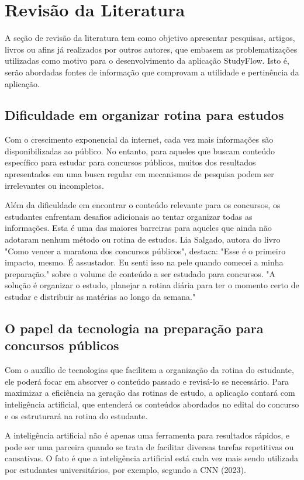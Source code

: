 \chapter{Revisão da Literatura}


A seção de revisão da literatura tem como objetivo apresentar pesquisas, artigos, livros ou afins já realizados por outros autores, que embasem as problematizações utilizadas como motivo para o desenvolvimento da aplicação StudyFlow. Isto é, serão abordadas fontes de informação que comprovam a utilidade e pertinência da aplicação.

\section{Dificuldade em organizar rotina para estudos}

Com o crescimento exponencial da internet, cada vez mais informações são disponibilizadas ao público. No entanto, para aqueles que buscam conteúdo específico para estudar para concursos públicos, muitos dos resultados apresentados em uma busca regular em mecanismos de pesquisa podem ser irrelevantes ou incompletos.

Além da dificuldade em encontrar o conteúdo relevante para os concursos, os estudantes enfrentam desafios adicionais ao tentar organizar todas as informações. Esta é uma das maiores barreiras para aqueles que ainda não adotaram nenhum método ou rotina de estudos. Lia Salgado, autora do livro "Como vencer a maratona dos concursos públicos", destaca: "Esse é o primeiro impacto, mesmo. É assustador. Eu senti isso na pele quando comecei a minha preparação." sobre o volume de conteúdo a ser estudado para concursos. "A solução é organizar o estudo, planejar a rotina diária para ter o momento certo de estudar e distribuir as matérias ao longo da semana."


\section{O papel da tecnologia na preparação para concursos públicos}

Com o auxílio de tecnologias que facilitem a organização da rotina do estudante, ele poderá focar em absorver o conteúdo passado e revisá-lo se necessário. Para maximizar a eficiência na geração das rotinas de estudo, a aplicação contará com inteligência artificial, que entenderá os conteúdos abordados no edital do concurso e os estruturará na rotina do estudante.

A inteligência artificial não é apenas uma ferramenta para resultados rápidos, e pode ser uma parceira quando se trata de facilitar diversas tarefas repetitivas ou cansativas. O fato é que a inteligência artificial está cada vez mais sendo utilizada por estudantes universitários, por exemplo, segundo a CNN (2023).
